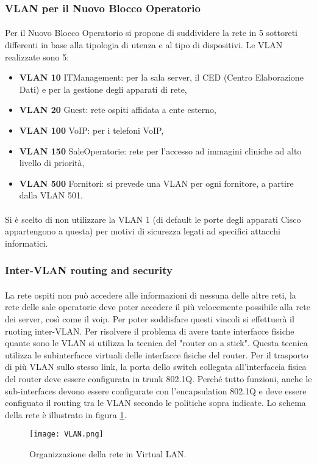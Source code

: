 \subsubsection{VLAN per il Nuovo Blocco Operatorio} 
\paragraph{} Per il Nuovo Blocco Operatorio si propone di suddividere la rete in 5 sottoreti differenti in base alla tipologia di utenza e al tipo di dispositivi.  Le VLAN realizzate sono 5:
\begin{itemize}
	\item \textbf{VLAN 10} ITManagement: per la sala server, il CED (Centro Elaborazione Dati) e per la gestione degli apparati di rete,
	\item \textbf{VLAN 20} Guest: rete ospiti affidata a ente esterno,
	\item \textbf{VLAN 100} VoIP: per i telefoni VoIP,
	\item \textbf{VLAN 150} SaleOperatorie: rete per l'accesso ad immagini cliniche ad alto livello di priorità,
	\item \textbf{VLAN 500} Fornitori: si prevede una VLAN per ogni fornitore, a partire dalla VLAN 501.
\end{itemize}
\paragraph{} Si è scelto di non utilizzare la VLAN 1 (di default le porte degli apparati Cisco appartengono
a questa) per motivi di sicurezza legati ad specifici attacchi informatici.
\subsubsection{Inter-VLAN routing and security}
\paragraph{} La rete ospiti non può accedere alle informazioni di nessuna delle altre reti, la rete delle sale operatorie deve poter accedere il più velocemente possibile alla rete dei server, così come il voip. Per poter soddisfare questi vincoli si effettuerà il ruoting inter-VLAN. Per risolvere il problema di avere tante interfacce fisiche quante sono le VLAN si utilizza la tecnica del "router on a stick". Questa tecnica utilizza le subinterfacce virtuali delle interfacce fisiche del router. Per il trasporto di più VLAN sullo stesso link, la porta dello switch collegata all’interfaccia fisica del router deve essere configurata in trunk 802.1Q. Perché tutto funzioni, anche le sub-interfaces devono essere configurate con l’encapsulation 802.1Q e deve essere configuato il routing tra le VLAN secondo le politiche sopra indicate. Lo schema della rete è illustrato in figura \ref{fig:vlan}.
\begin{figure}[ht]
  \texttt{[image: VLAN.png]}
  \caption{Organizzazione della rete in Virtual LAN.}
  \label{fig:vlan}
\end{figure}


